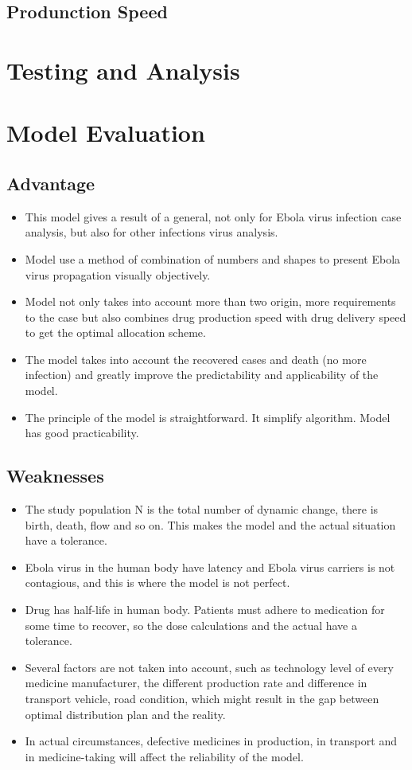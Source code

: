 \documentclass{icmmcm}
\begin{document}
\subsection{Produnction Speed}

\section{Testing and Analysis}


\section{Model Evaluation}
\subsection{Advantage}
\begin{itemize}
  \item This model gives a result of a general, not only for
  Ebola virus infection case analysis, but also for other
  infections virus analysis.
  \item Model use a method of combination of numbers and shapes
  to present Ebola virus propagation visually objectively.
  \item Model not only takes into account more than two origin,
  more requirements to the case  but also combines drug
  production speed with drug delivery speed to get the optimal
  allocation scheme.
  \item The model takes into account the recovered cases and
  death (no more infection) and greatly improve the
  predictability and applicability of the model.
  \item The principle of the model is straightforward. It
  simplify algorithm. Model has good practicability.
\end{itemize}
\subsection{Weaknesses}
\begin{itemize}
  \item The study population N is the total number of dynamic
  change, there is birth, death, flow and so on. This makes the
  model and the actual situation have a tolerance.
  \item Ebola virus in the human body have latency and Ebola
  virus carriers is not contagious, and this is where the model
  is not perfect.
  \item  Drug has half-life in human body. Patients must adhere
  to medication for some time to recover, so the dose
  calculations and the actual have a tolerance.
  \item Several factors are not taken into account, such as
  technology level of every medicine manufacturer, the
  different production rate and difference in transport
  vehicle, road condition, which might result in the gap
  between optimal distribution plan and the reality.
  \item In actual circumstances, defective medicines in
  production, in transport and in medicine-taking will affect
  the reliability of the model.
\end{itemize}
\end{document}
